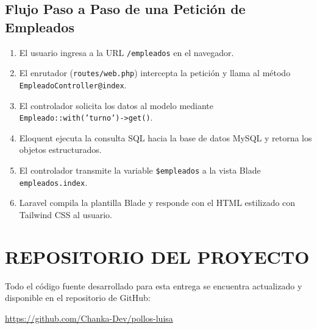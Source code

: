\documentclass[12pt, letterpaper]{article}
\begin{document}
\subsection{Flujo Paso a Paso de una Petición de Empleados}
\begin{enumerate}
    \item El usuario ingresa a la URL \texttt{/empleados} en el navegador.
    \item El enrutador (\texttt{routes/web.php}) intercepta la petición y llama al método \texttt{EmpleadoController@index}.
    \item El controlador solicita los datos al modelo mediante \texttt{Empleado::with('turno')->get()}.
    \item Eloquent ejecuta la consulta SQL hacia la base de datos MySQL y retorna los objetos estructurados.
    \item El controlador transmite la variable \texttt{\$empleados} a la vista Blade \texttt{empleados.index}.
    \item Laravel compila la plantilla Blade y responde con el HTML estilizado con Tailwind CSS al usuario.
\end{enumerate}

\newpage
\section*{REPOSITORIO DEL PROYECTO}

Todo el código fuente desarrollado para esta entrega se encuentra actualizado y disponible en el repositorio de GitHub:

\begin{center}
    \url{https://github.com/Chanka-Dev/pollos-luisa}
\end{center}
\end{document}
